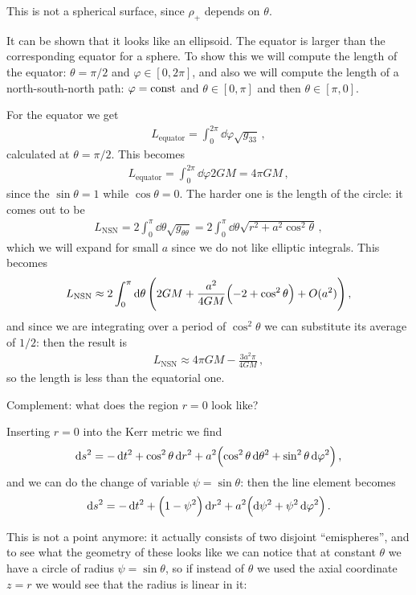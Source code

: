 \documentclass[main.tex]{subfiles}
\begin{document}
This is not a spherical surface, since \(\rho_{+}\) depends on \(\theta \). 

It can be shown that it looks like an ellipsoid. The equator is larger than the corresponding equator for a sphere. To show this we will compute the length of the equator: \(\theta = \pi /2\) and \(\varphi \in [0, 2 \pi ]\), and also we will compute the length of a north-south-north path: \(\varphi = \text{const}\) and \(\theta \in [0, \pi ]\) and then \(\theta \in [\pi , 0]\).

For the equator we get 
%
\begin{align}
  L _{\text{equator}} = \int_{0}^{2 \pi } \dd{\varphi } \sqrt{g_{33}}
\,,
\end{align}
%
calculated at \(\theta = \pi /2\). This becomes 
%
\begin{align}
  L _{\text{equator}} = \int_{0}^{2 \pi } \dd{\varphi } 2GM = 4 \pi GM
\,,
\end{align}
%
since the \(\sin \theta = 1\) while \(\cos \theta = 0\). The harder one is the length of the circle: it comes out to be 
%
\begin{align}
  L _{\text{NSN}} = 2 \int_{0}^{\pi }  \dd{\theta } \sqrt{g_{\theta \theta }}
  = 2 \int_{0}^{\pi } \dd{\theta } \sqrt{r^2 + a^2 \cos^2\theta }
\,,
\end{align}
%
which we will expand for small \(a\) since we do not like elliptic integrals. This becomes 
%
\begin{align}
  L _{\text{NSN}} \approx 2 \int_{0}^{\pi } \dd{\theta } \qty(2GM + \frac{a^2}{4GM} \qty(-2 + \cos^2 \theta )  + O(a^2))
\,,
\end{align}
%
and since we are integrating over a period of \(\cos^2\theta\) we can substitute its average of \(1/2\): then the result is 
%
\begin{align}
L _{\text{NSN}} \approx 4\pi GM - \frac{3a^2 \pi }{4GM}
\,,
\end{align}
%
so the length is less than the equatorial one. 

\begin{bluebox}
Complement: what does the region \(r=0\) look like? 

Inserting \(r=0\) into the Kerr metric we find 
%
\begin{align}
  \dd{s^2} = - \dd{t^2} + \cos^2\theta \dd{r^2}
  + a^2 \qty(\cos^2 \theta \dd{\theta^2} + \sin^2 \theta \dd{\varphi^2})
\,,
\end{align}
%
and we can do the change of variable \(\psi = \sin \theta \): then the line element becomes 
%
\begin{align}
  \dd{s^2} = - \dd{t^2} + \qty(1 - \psi^2) \dd{r^2} +a^2 \qty(\dd{\psi^2} + \psi^2 \dd{\varphi^2})
\,.
\end{align}

This is not a point anymore: it actually consists of two disjoint ``emispheres'', and to see what the geometry of these looks like we can notice that at constant \(\theta \) we have a circle of radius \(\psi =\sin \theta \), so if instead of \(\theta \) we used the axial coordinate \(z = r \) we would see that the radius is linear in it: 

\end{bluebox}
\end{document}
